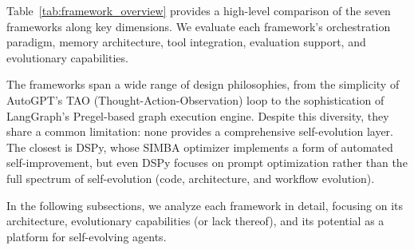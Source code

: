 Table~\ref{tab:framework_overview} provides a high-level comparison of the seven frameworks along key dimensions. We evaluate each framework's orchestration paradigm, memory architecture, tool integration, evaluation support, and evolutionary capabilities.

\begin{table}[t]
\centering
\small
\caption{Overview of agent frameworks analyzed in this survey. Evolution capability is assessed relative to the Five Evolution Loops taxonomy.}
\label{tab:framework_overview}
\end{table}

The frameworks span a wide range of design philosophies, from the simplicity of AutoGPT's TAO (Thought-Action-Observation) loop to the sophistication of LangGraph's Pregel-based graph execution engine. Despite this diversity, they share a common limitation: none provides a comprehensive self-evolution layer. The closest is DSPy, whose SIMBA optimizer implements a form of automated self-improvement, but even DSPy focuses on prompt optimization rather than the full spectrum of self-evolution (code, architecture, and workflow evolution).

In the following subsections, we analyze each framework in detail, focusing on its architecture, evolutionary capabilities (or lack thereof), and its potential as a platform for self-evolving agents.


